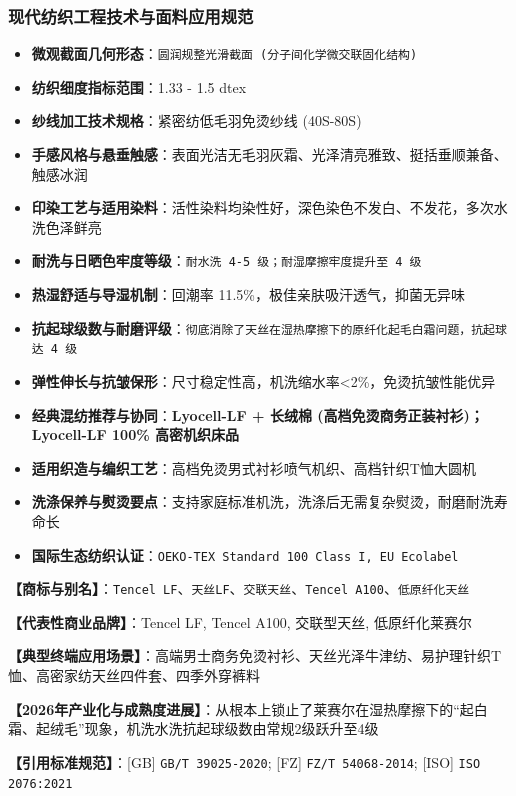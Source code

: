 \documentclass[11pt,openright,twoside,UTF8]{ctexbook}
\begin{document}
\subsubsection*{现代纺织工程技术与面料应用规范}
\begin{itemize} \setlength{\itemsep}{2pt}
    \item \textbf{微观截面几何形态}：\texttt{圆润规整光滑截面 (分子间化学微交联固化结构)}
    \item \textbf{纺织细度指标范围}：1.33 - 1.5 dtex
    \item \textbf{纱线加工技术规格}：紧密纺低毛羽免烫纱线 (40S-80S)
    \item \textbf{手感风格与悬垂触感}：表面光洁无毛羽灰霜、光泽清亮雅致、挺括垂顺兼备、触感冰润
    \item \textbf{印染工艺与适用染料}：活性染料均染性好，深色染色不发白、不发花，多次水洗色泽鲜亮
    \item \textbf{耐洗与日晒色牢度等级}：\texttt{耐水洗 4-5 级；耐湿摩擦牢度提升至 4 级}
    \item \textbf{热湿舒适与导湿机制}：回潮率 11.5\%，极佳亲肤吸汗透气，抑菌无异味
    \item \textbf{抗起球级数与耐磨评级}：\texttt{彻底消除了天丝在湿热摩擦下的原纤化起毛白霜问题，抗起球达 4 级}
    \item \textbf{弹性伸长与抗皱保形}：尺寸稳定性高，机洗缩水率\textless{}2\%，免烫抗皱性能优异
    \item \textbf{经典混纺推荐与协同}：\textbf{Lyocell-LF + 长绒棉 (高档免烫商务正装衬衫)；Lyocell-LF 100\% 高密机织床品}
    \item \textbf{适用织造与编织工艺}：高档免烫男式衬衫喷气机织、高档针织T恤大圆机
    \item \textbf{洗涤保养与熨烫要点}：支持家庭标准机洗，洗涤后无需复杂熨烫，耐磨耐洗寿命长
    \item \textbf{国际生态纺织认证}：\texttt{OEKO-TEX Standard 100 Class I, EU Ecolabel}
\end{itemize}
\vspace{0.2cm}

\noindent\textbf{【商标与别名】}：\texttt{Tencel LF}、\texttt{天丝LF}、\texttt{交联天丝}、\texttt{Tencel A100}、\texttt{低原纤化天丝}\par
\noindent\textbf{【代表性商业品牌】}：Tencel LF, Tencel A100, 交联型天丝, 低原纤化莱赛尔\par
\noindent\textbf{【典型终端应用场景】}：高端男士商务免烫衬衫、天丝光泽牛津纺、易护理针织T恤、高密家纺天丝四件套、四季外穿裤料\par
\noindent\textbf{【2026年产业化与成熟度进展】}：从根本上锁止了莱赛尔在湿热摩擦下的“起白霜、起绒毛”现象，机洗水洗抗起球级数由常规2级跃升至4级\par
\noindent\textbf{【引用标准规范】}：[GB] \texttt{GB/T 39025-2020}; [FZ] \texttt{FZ/T 54068-2014}; [ISO] \texttt{ISO 2076:2021}\par
\vspace{0.5cm}
\end{document}
